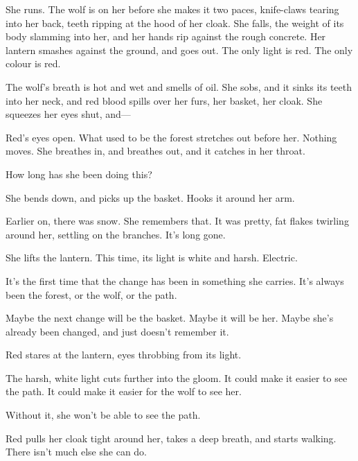 She runs. The wolf is on her before she makes it two paces, knife-claws tearing into her back, teeth ripping at the hood of her cloak. She falls, the weight of its body slamming into her, and her hands rip against the rough concrete. Her lantern smashes against the ground, and goes out. The only light is red. The only colour is red. 

The wolf's breath is hot and wet and smells of oil. She sobs, and it sinks its teeth into her neck, and red blood spills over her furs, her basket, her cloak. She squeezes her eyes shut, and---

Red's eyes open. What used to be the forest stretches out before her. Nothing moves. She breathes in, and breathes out, and it catches in her throat. 

How long has she been doing this? 

She bends down, and picks up the basket. Hooks it around her arm. 

Earlier on, there was snow. She remembers that. It was pretty, fat flakes twirling around her, settling on the branches. It's long gone. 

She lifts the lantern. This time, its light is white and harsh. Electric.

It's the first time that the change has been in something she carries. It's always been the forest, or the wolf, or the path. 

Maybe the next change will be the basket. Maybe it will be her. Maybe she's already been changed, and just doesn't remember it. 

Red stares at the lantern, eyes throbbing from its light. 

The harsh, white light cuts further into the gloom. It could make it easier to see the path. It could make it easier for the wolf to see her. 

Without it, she won't be able to see the path. 

Red pulls her cloak tight around her, takes a deep breath, and starts walking. There isn't much else she can do.
